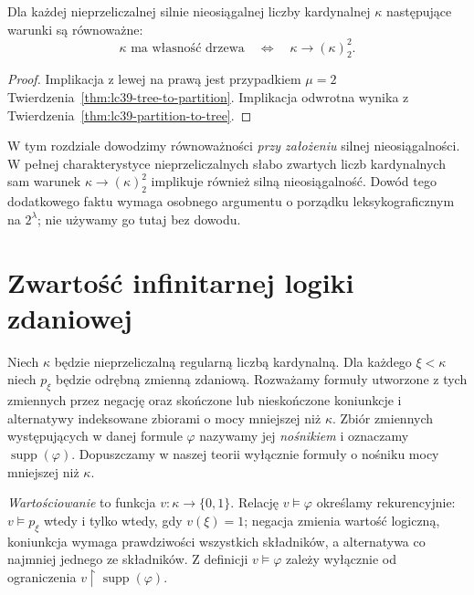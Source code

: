 \begin{wniosek}
\label{cor:lc39-tree-partition}
Dla każdej nieprzeliczalnej
silnie nieosiągalnej liczby
kardynalnej $\kappa$
następujące warunki są
równoważne:
\[
 \kappa\text{ ma własność drzewa}
 \quad\Longleftrightarrow\quad
 \kappa\longrightarrow(\kappa)^2_2.
\]
\end{wniosek}
\begin{proof}
Implikacja z lewej na prawą
jest przypadkiem $\mu=2$
Twierdzenia~\ref{thm:lc39-tree-to-partition}.
Implikacja odwrotna wynika
z Twierdzenia~\ref{thm:lc39-partition-to-tree}.
\end{proof}

\begin{uwaga}
\label{rem:lc39-scope}
W tym rozdziale dowodzimy
równoważności \emph{przy założeniu}
silnej nieosiągalności.
W pełnej charakterystyce
nieprzeliczalnych słabo zwartych
liczb kardynalnych sam warunek
$\kappa\to(\kappa)^2_2$
implikuje również silną
nieosiągalność. Dowód tego
dodatkowego faktu wymaga
osobnego argumentu o porządku
leksykograficznym na $2^\lambda$;
nie używamy go tutaj bez dowodu.
\end{uwaga}

\section{Zwartość infinitarnej logiki zdaniowej}

\begin{definicja}
\label{def:lc39-propositional-infinitary}
Niech $\kappa$ będzie nieprzeliczalną
regularną liczbą kardynalną.
Dla każdego $\xi<\kappa$
niech $p_\xi$ będzie odrębną
zmienną zdaniową.
Rozważamy formuły utworzone
z tych zmiennych przez
negację oraz skończone
lub nieskończone koniunkcje
i alternatywy indeksowane
zbiorami o mocy mniejszej
niż $\kappa$.
Zbiór zmiennych występujących
w danej formule $\varphi$
nazywamy jej \emph{nośnikiem}
i oznaczamy $\operatorname{supp}(\varphi)$.
Dopuszczamy w naszej teorii
wyłącznie formuły o nośniku
mocy mniejszej niż $\kappa$.

\emph{Wartościowanie} to funkcja
$v:\kappa\to\{0,1\}$.
Relację $v\models\varphi$
określamy rekurencyjnie:
$v\models p_\xi$ wtedy i tylko
wtedy, gdy $v(\xi)=1$;
negacja zmienia wartość
logiczną, koniunkcja
wymaga prawdziwości
wszystkich składników,
a alternatywa co najmniej
jednego ze składników.
Z definicji
$v\models\varphi$ zależy
wyłącznie od ograniczenia
$v\restriction\operatorname{supp}(\varphi)$.
\end{definicja}

